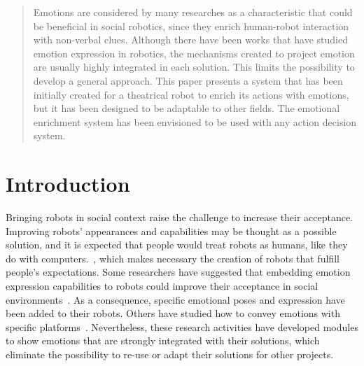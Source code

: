 \documentclass{sig-alternate-05-2015}
\begin{document}
\maketitle
\begin{abstract}
Emotions are considered by many researches as a characteristic that could be beneficial in social robotics, since they enrich human-robot interaction with non-verbal clues. Although there have been works that have studied emotion expression in robotics, the mechanisms created to project emotion are usually highly integrated in each solution. This limits the possibility to develop a general approach. 
This paper presents a system that has been initially created for a theatrical robot to enrich its actions with emotions, but it has been designed to be adaptable to other fields. The emotional enrichment system has been envisioned to be used with any action decision system. 
\end{abstract}

\printccsdesc



\section{Introduction}

Bringing robots in social context raise the challenge to increase their acceptance. Improving robots' appearances and capabilities may be thought as a possible solution, and it is expected that people would treat robots as humans, like they do with computers.~\cite{Reeves1996}, which makes necessary the creation of robots that fulfill people's expectations. Some researchers have suggested that embedding emotion expression capabilities to robots could improve their acceptance in social environments~\cite{Pavia2014}. As a consequence, specific emotional poses and expression have been added to their robots. Others have studied how to convey emotions with specific platforms~\cite{Li2011,Brown2014}. Nevertheless, these research activities have developed modules to show emotions that are strongly integrated with their solutions, which eliminate the possibility to re-use or adapt their solutions for other projects. 
 
\end{document}
